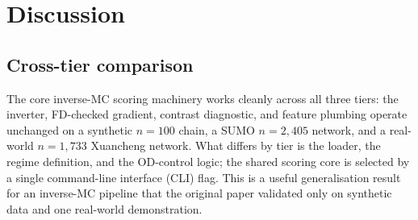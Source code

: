 \section{Discussion}\label{sec:discussion}

\subsection{Cross-tier comparison}
\label{sec:disc-cross-tier}

The core inverse-MC scoring machinery works cleanly across all three
tiers: the inverter, FD-checked gradient, contrast diagnostic, and
feature plumbing operate unchanged on a synthetic $n=100$ chain, a SUMO
$n=2{,}405$ network, and a real-world $n=1{,}733$ Xuancheng network. What
differs by tier is the loader, the regime definition, and the
OD-control logic; the shared scoring core is selected by a single
 command-line interface (CLI) flag. This is a useful
generalisation result for an inverse-MC pipeline that the original paper
validated only on synthetic data and one real-world demonstration.

